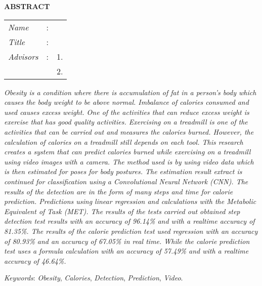 \begin{center}
  \large\textbf{ABSTRACT}
\end{center}


\vspace{2ex}

\begingroup
\setlength{\tabcolsep}{0pt}

\noindent
\begin{tabularx}{\textwidth}{l >{\centering}m{3em} X}
  \emph{Name}     & : & \name{}         \\

  \emph{Title}    & : & \engtatitle{}   \\

  \emph{Advisors} & : & 1. \advisor{}   \\
                  &   & 2. \coadvisor{} \\
\end{tabularx}
\endgroup

\emph{Obesity is a condition where there is accumulation of fat in a person's body which causes the body weight to be above normal. Imbalance of calories consumed and used causes excess weight. One of the activities that can reduce excess weight is exercise that has good quality activities. Exercising on a treadmill is one of the activities that can be carried out and measures the calories burned. However, the calculation of calories on a treadmill still depends on each tool. This research creates a system that can predict calories burned while exercising on a treadmill using video images with a camera. The method used is by using video data which is then estimated for poses for body postures. The estimation result extract is continued for classification using a Convolutional Neural Network (CNN). The results of the detection are in the form of many steps and time for calorie prediction. Predictions using linear regression and calculations with the Metabolic Equivalent of Task (MET). The results of the tests carried out obtained step detection test results with an accuracy of 96.14\% and with a realtime accuracy of 81.35\%. The results of the calorie prediction test used regression with an accuracy of 80.93\% and an accuracy of 67.05\% in real time. While the calorie prediction test uses a formula calculation with an accuracy of 57.49\% and with a realtime accuracy of 46.64\%.}

\emph{Keywords}: \emph{Obesity}, \emph{Calories}, \emph{Detection}, \emph{Prediction}, \emph{Video}.
